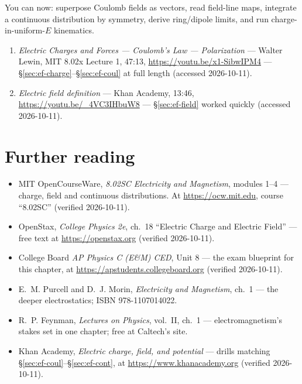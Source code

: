 \begin{wins}
You can now: superpose Coulomb fields as vectors, read field-line maps,
integrate a continuous distribution by symmetry, derive ring/dipole
limits, and run charge-in-uniform-$E$ kinematics.
\end{wins}


\begin{rulebox}
\begin{enumerate}
\item \emph{Electric Charges and Forces --- Coulomb's Law --- Polarization}
--- Walter Lewin, MIT 8.02x Lecture 1, 47:13,
\url{https://youtu.be/x1-SibwIPM4} ---
\S\ref{sec:ef-charge}--\S\ref{sec:ef-coul} at full length (accessed
2026-10-11).
\item \emph{Electric field definition} --- Khan Academy, 13:46,
\url{https://youtu.be/_4VC3IHbuW8} --- \S\ref{sec:ef-field} worked
quickly (accessed 2026-10-11).
\end{enumerate}
\end{rulebox}

\section*{Further reading}

\begin{itemize}
\item MIT OpenCourseWare, \emph{8.02SC Electricity and Magnetism},
modules 1--4 --- charge, field and continuous distributions. At
\url{https://ocw.mit.edu}, course ``8.02SC'' (verified 2026-10-11).
\item OpenStax, \emph{College Physics 2e}, ch.~18 ``Electric Charge and
Electric Field'' --- free text at \url{https://openstax.org} (verified
2026-10-11).
\item College Board \emph{AP Physics C (E\&M) CED}, Unit 8 ---
the exam blueprint for this chapter, at
\url{https://apstudents.collegeboard.org} (verified 2026-10-11).
\item E.~M. Purcell and D.~J. Morin, \emph{Electricity and Magnetism},
ch.~1 --- the deeper electrostatics; ISBN 978-1107014022.
\item R.~P. Feynman, \emph{Lectures on Physics}, vol.~II, ch.~1 ---
electromagnetism's stakes set in one chapter; free at Caltech's site.
\item Khan Academy, \emph{Electric charge, field, and potential} ---
drills matching \S\ref{sec:ef-coul}--\S\ref{sec:ef-cont}, at
\url{https://www.khanacademy.org} (verified 2026-10-11).
\end{itemize}

